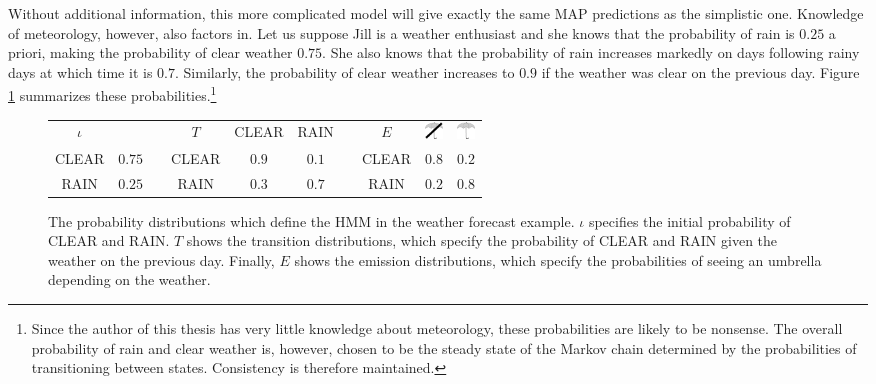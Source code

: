Without additional information, this more complicated model will give
exactly the same MAP predictions as the simplistic one. Knowledge of
meteorology, however, also factors in. Let us suppose Jill is a
weather enthusiast and she knows that the probability of rain is
$0.25$ a priori, making the probability of clear weather $0.75$. She also knows
that the probability of rain increases markedly on days following
rainy days at which time it is $0.7$.  Similarly, the probability of
clear weather increases to $0.9$ if the weather was clear on the
previous day. Figure \ref{hmm-ex-1} summarizes these
probabilities.\footnote{Since the author of this thesis has very
  little knowledge about meteorology, these probabilities are likely
  to be nonsense. The overall probability of rain and clear weather
  is, however, chosen to be the steady state of the Markov chain
  determined by the probabilities of transitioning between
  states. Consistency is therefore maintained.}

\begin{figure}[!htb]
\begin{center}
\begin{tabular}{c|ccc|c|ccc|c|c}
\cline{1-2}
\cline{4-6}
\cline{8-10}
   $\iota$   &       & \phantom{0000} &  $T$   & CLEAR & RAIN  & \phantom{0000} &    $E$   & \parbox[c][0.7cm]{0.47cm}{\includegraphics[width=0.47cm]{no_umbrella}} & \parbox[c][0.7cm]{0.47cm}{\includegraphics[width=0.47cm]{umbrella}}\\
CLEAR  & $0.75$  & & CLEAR  & $0.9$ & $0.1$  & & CLEAR   & $0.8$ &  $0.2$       \\
RAIN  & $0.25$ & & RAIN   & $0.3$ & $0.7$ & & RAIN    & $0.2$ &  $0.8$ \\
\end{tabular}
\end{center}
\caption{The probability distributions which define the HMM in the
  weather forecast example. $\iota$ specifies the initial probability
  of CLEAR and RAIN. $T$ shows the transition distributions, which
  specify the probability of CLEAR and RAIN given the weather on the
  previous day. Finally, $E$ shows the emission distributions, which
  specify the probabilities of seeing an umbrella depending on the
  weather.}\label{hmm-ex-1}
\end{figure}

